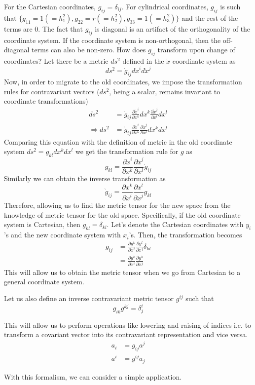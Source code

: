 \documentclass[11pt, letterpaper]{article}
\newcommand{\dl}{\delta}
\newcommand{\dij}{\delta_{ij}}
\newcommand{\mdij}{\delta^i_j}
\newcommand{\1}{\bm{1}}
\newcommand{\pd}[2]{\frac{\partial #1}{\partial #2}}
\newcommand{\p}[1]{\grave{#1}} %
\begin{document}
For the Cartesian coordinates, $g_{ij} = \dij$. For cylindrical coordinates, $g_{ij}$ is such that $\{g_{11} = 1(=h_1^2),g_{22} = r(=h_2^2),g_{33} = 1(=h_3^2)\}$ and the rest of the terms are $0$. The fact that $g_{ij}$ is diagonal is an artifact of the orthogonality of the coordinate system. If the coordinate system is non-orthogonal, then the off-diagonal terms can also be non-zero. How does $g_{ij}$ transform upon change of coordinates? Let there be a metric $ds^2$ defined in the $\p x$ coordinate system as
$$
ds^2 = \p g_{ij} d\p x^i d \p x^j
$$
Now, in order to migrate to the old coordinates, we impose the transformation rules for contravariant vectors ($ds^2$, being a scalar, remains invariant to coordinate transformations)
\begin{align*}
ds^2 &= \p g_{ij}\pd{\p x^i}{x^k}dx^k \pd{\p x^j}{x^l}dx^l\\
\Rightarrow ds^2 &=\p g_{ij}\pd{\p x^i}{x^k}\pd{\p x^j}{x^l} dx^k dx^l
\end{align*}
Comparing this equation with the definition of metric in the old coordinate system $ ds^2 = g_{kl} dx^k dx^l $ we get the transformation rule for $g$ as
$$
g_{kl} = \pd{\p x^i}{x^k}\pd{\p x^j}{x^l} \p g_{ij}
$$
Similarly we can obtain the inverse transformation as
$$
\p g_{ij} = \pd{x^k}{\p x^i}\pd{x^l}{\p x^j}g_{kl}
$$
Therefore, allowing us to find the metric tensor for the new space from the knowledge of metric tensor for the old space. Specifically, if the old coordinate system is Cartesian, then $g_{kl} = \dl_{kl}$. Let's denote the Cartesian coordinates with $y_i$'s  and the new coordinate system with $x_i$'s. Then, the transformation becomes
\begin{align*}
g_{ij} &= \pd{y^k}{x^i}\pd{y^l}{x^j}\dl_{kl} \\
&=\pd{y^k}{x^i}\pd{y^k}{x^j}
\end{align*}
This will allow us to obtain the metric tensor when we go from Cartesian to a general coordinate system. 


Let us also define an inverse contravariant metric tensor $g^{ij}$ such that
$$
g_{ik}g^{kj}=\mdij
$$

This will allow us to perform operations like lowering and raising of indices i.e. to transform a covariant vector into its contravariant representation and vice versa.
\begin{align*}
a_i &= g_{ij}a^j\\
a^i &= g^{ij}a_j
\end{align*}

With this formalism, we can consider a simple application.
\end{document}
